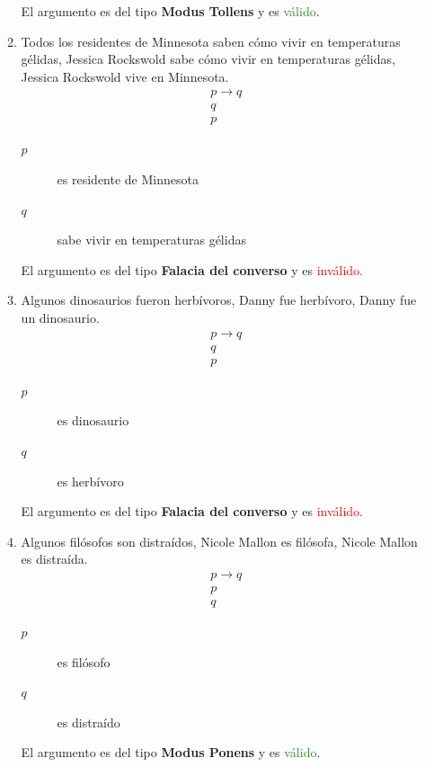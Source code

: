 \documentclass[12pt,letterpaper]{exam}
\begin{document}
\begin{enumerate}
\begin{enumerate}[label=\alph*)]
El argumento es del tipo \textbf{Modus Tollens} y es \textcolor{ForestGreen}{válido}.

\item Todos los residentes de Minnesota saben cómo vivir en temperaturas gélidas, Jessica Rockswold sabe cómo vivir en temperaturas gélidas, Jessica Rockswold vive en Minnesota.
\[
\begin{array}{c}
p \to q \\
q \\
\hline
p
\end{array}
\]
\begin{description}
  \item[$p$] es residente de Minnesota
  \item[$q$] sabe vivir en temperaturas gélidas
\end{description}

El argumento es del tipo \textbf{Falacia del converso} y es \textcolor{red}{inválido}.

\item Algunos dinosaurios fueron herbívoros, Danny fue herbívoro, Danny fue un dinosaurio.
\[
\begin{array}{c}
p \to q \\
q \\
\hline
p
\end{array}
\]
\begin{description}
  \item[$p$] es dinosaurio
  \item[$q$] es herbívoro
\end{description}

El argumento es del tipo \textbf{Falacia del converso} y es \textcolor{red}{inválido}.

\item Algunos filósofos son distraídos, Nicole Mallon es filósofa, Nicole Mallon es distraída.
\[
\begin{array}{c}
p \to q \\
p \\
\hline
q
\end{array}
\]
\begin{description}
  \item[$p$] es filósofo
  \item[$q$] es distraído
\end{description}

El argumento es del tipo \textbf{Modus Ponens} y es \textcolor{ForestGreen}{válido}.


\end{enumerate}
\end{enumerate}
\end{document}

